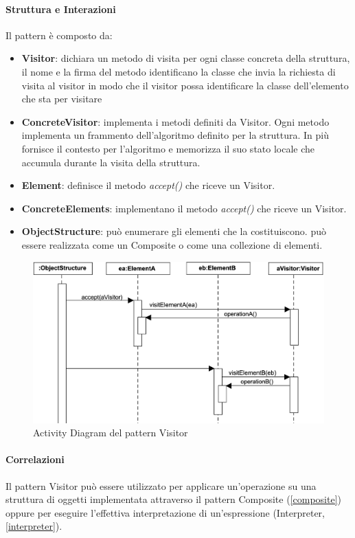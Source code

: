 \newpage

\paragraph{Struttura e Interazioni} Il pattern è composto da:
\begin{itemize}
    \item \textbf{Visitor}: dichiara un metodo di visita per ogni classe concreta della struttura, il nome e la firma del metodo identificano la classe che invia la richiesta di visita al visitor in modo che il visitor possa identificare la classe dell’elemento che sta per visitare 
    \item \textbf{ConcreteVisitor}: implementa i metodi definiti da Visitor. Ogni metodo implementa un frammento dell’algoritmo definito per la struttura. In più fornisce il contesto per l’algoritmo e memorizza il suo stato locale che accumula durante la visita della struttura. 
    \item \textbf{Element}: definisce il metodo \textit{accept()} che riceve un Visitor.
    \item \textbf{ConcreteElements}: implementano il metodo \textit{accept()} che riceve un Visitor.
    \item \textbf{ObjectStructure}: può enumerare gli elementi che la costituiscono. può essere realizzata come un Composite o come una collezione di elementi.
\end{itemize}

\begin{figure}[H]
    \centering
    \includegraphics[width=1\linewidth]{assets/pattern/visitor/visitor-activity.png}
    \caption{Activity Diagram del pattern Visitor}
\end{figure}

\paragraph{Correlazioni} Il pattern Visitor può essere utilizzato per applicare un'operazione su una struttura di oggetti implementata attraverso il pattern Composite (\ref{composite}) oppure per eseguire l'effettiva interpretazione di un'espressione (Interpreter, \ref{interpreter}).


\newpage